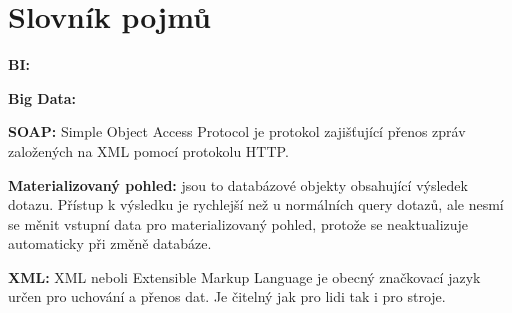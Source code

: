\documentclass[czech,BP]{thesiskiv2}
\begin{document}
% 
%
\chapter{Slovník pojmů}



\textbf{BI:}  \cite{BI}

\textbf{Big Data:}  \cite{BigData}

\textbf{SOAP:} Simple Object Access Protocol je protokol zajišťující přenos zpráv založených na XML pomocí protokolu HTTP.

\textbf{Materializovaný pohled:} jsou to databázové objekty obsahující výsledek dotazu. Přístup k výsledku je rychlejší než u normálních query dotazů, ale nesmí se měnit vstupní data pro materializovaný pohled, protože se neaktualizuje automaticky při změně databáze.

\textbf{XML:} XML neboli Extensible Markup Language je obecný značkovací jazyk určen pro uchování a přenos dat. Je čitelný jak pro lidi tak i pro stroje.




{\raggedright\small

}
\end{document}
